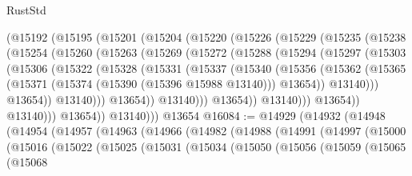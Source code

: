 \begin{lexlean}{RustStd}
\begin{coremodule}
        (@15192
          (@15195
            (@15201
              (@15204
                (@15220
                  (@15226
                    (@15229
                      (@15235
                        (@15238
                          (@15254
                            (@15260
                              (@15263
                                (@15269
                                  (@15272
                                    (@15288
                                      (@15294
                                        (@15297
                                          (@15303
                                            (@15306
                                              (@15322
                                                (@15328
                                                  (@15331
                                                    (@15337
                                                      (@15340
                                                        (@15356
                                                          (@15362
                                                            (@15365
                                                              (@15371
                                                                (@15374
                                                                  (@15390 (@15396 @15988 @13140)))
                                                                @13654))
                                                            @13140)))
                                                      @13654))
                                                  @13140)))
                                            @13654))
                                        @13140)))
                                  @13654))
                              @13140)))
                        @13654))
                    @13140)))
              @13654))
          @13140)))
    @13654
@16084 := @14929
    (@14932
      (@14948
        (@14954
          (@14957
            (@14963
              (@14966
                (@14982
                  (@14988
                    (@14991
                      (@14997
                        (@15000
                          (@15016
                            (@15022
                              (@15025
                                (@15031
                                  (@15034
                                    (@15050
                                      (@15056
                                        (@15059
                                          (@15065
                                            (@15068

\end{coremodule}
\end{lexlean}
